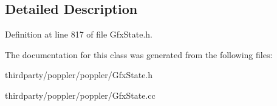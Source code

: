 \subsection{Detailed Description}


Definition at line 817 of file Gfx\+State.\+h.



The documentation for this class was generated from the following files\+:\begin{DoxyCompactItemize}
\item 
thirdparty/poppler/poppler/Gfx\+State.\+h\item 
thirdparty/poppler/poppler/Gfx\+State.\+cc\end{DoxyCompactItemize}
